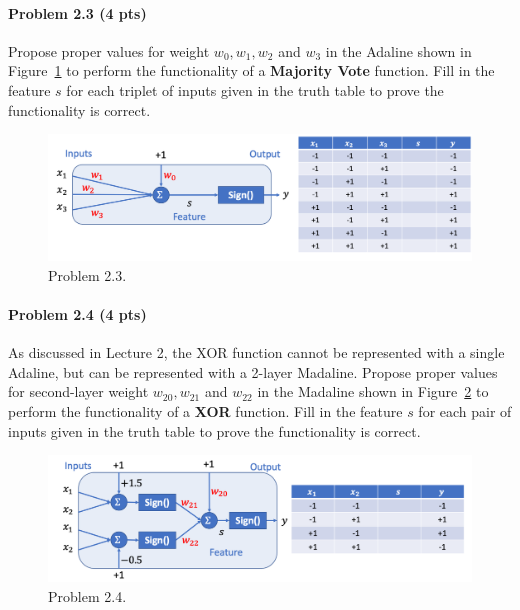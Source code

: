\paragraph{Problem 2.3 (4 pts)} Propose proper values for weight $w_0, w_1, w_2$ and $w_3$ in the Adaline shown in Figure~\ref{fig:2.3} to perform the functionality of a \textbf{Majority Vote} function. Fill in the feature $s$ for each triplet of inputs given in the truth table to prove the functionality is correct.

\begin{figure}[h]
\centering
  \includegraphics[width=1.0\linewidth]{Figures3.png}
  \vspace{-10pt}
  \caption{Problem 2.3.}
  \label{fig:2.3}
  \vspace{-10pt}
\end{figure}

\paragraph{Problem 2.4 (4 pts)} As discussed in Lecture 2, the XOR function cannot be represented with a single Adaline, but can be represented with a 2-layer Madaline. Propose proper values for second-layer weight $w_{20}, w_{21}$ and $w_{22}$ in the Madaline shown in Figure~\ref{fig:2.4} to perform the functionality of a \textbf{XOR} function. Fill in the feature $s$ for each pair of inputs given in the truth table to prove the functionality is correct.

\begin{figure}[h]
\centering
  \includegraphics[width=1.0\linewidth]{Figures4.png}
  \vspace{-10pt}
  \caption{Problem 2.4.}
  \label{fig:2.4}
  \vspace{-10pt}
\end{figure}

